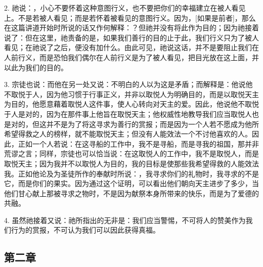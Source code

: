 2. 祂说：，小心不要怀着这种意图行义，也不要把你们的幸福建立在被人看见上。不是若被人看见；而是若怀着被看见的意图行义。因为，[如果是前者]，那么在这篇讲道开始时所说的话又作何解释：？但祂并没有将此作为目的；因为祂接着说了：但在这里，祂责备的是，如果我们善行的目的止于此，我们行义只为了被人看见；在祂说了之后，便没有加什么。由此可见，祂说这话，并不是要阻止我们在人前行义，而是恐怕我们偶尔在人前行义是为了被人看见，把目光放在这上面，并以此为我们的目的。\par

3. 宗徒也说：而他在另一处又说：不明白的人以为这是矛盾；而解释是：他说他不取悦于人，因为他习惯于行事正义，并非以取悦人为明确目的，而是以取悦天主为目的，他愿意藉着取悦人这件事，使人心转向对天主的爱。因此，他说他不取悦于人是对的，因为在那件事上他旨在取悦天主；他权威性地教导我们应当取悦人也是对的，但这并不是为了将这寻求为善行的赏报；而是因为一个人若不愿成为他所希望得救之人的榜样，就不能取悦天主；但没有人能效法一个不讨他喜欢的人。因此，正如一个人若说：在这寻船的工作中，我不是寻船，而是寻我的祖国，那并非荒谬之言；同样，宗徒也可以恰当说：在这取悦人的工作中，我不是取悦人，而是取悦天主；因为我并不以取悦人为目的，我的目标是使那些我希望得救的人能效法我。正如他论及为圣徒所作的奉献时所说：，我寻求你们的礼物时，我寻求的不是它，而是你们的果实。因为通过这个证明，可以看出他们朝向天主进步了多少，当他们甘心献上那被寻求之物时，不是因为献祭本身所带来的快乐，而是为了爱德的共融。\par

4. 虽然祂接着又说：祂所指出的无非是：我们应当警惕，不可将人的赞美作为我们行为的赏报，不可认为我们可以因此获得真福。\par


\subsection{第二章}

